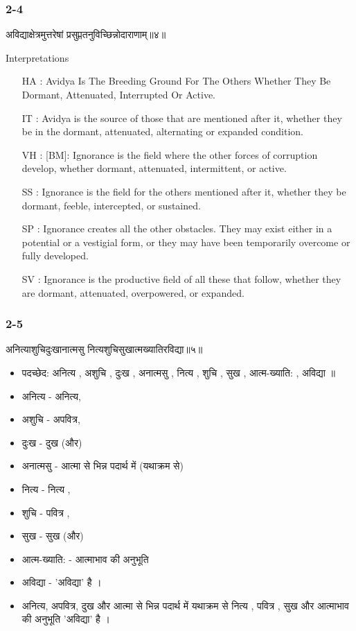 \begin{frame}[fragile]\frametitle{2-4}
\begin{sanskrit}
अविद्याक्षेत्रमुत्तरेषां प्रसुप्ततनुविच्छिन्नोदाराणाम्॥४॥
\end{sanskrit}

Interpretations
\begin{itemize}
\item [HA]: Avidya Is The Breeding Ground For The Others Whether They Be Dormant, Attenuated, Interrupted Or Active.
\item [IT]: Avidya is the source of those that are mentioned after it, whether they be in the dormant, attenuated, alternating or expanded condition.
\item [VH]: [BM]: Ignorance is the field where the other forces of corruption develop, whether dormant, attenuated, intermittent, or active.
\item [SS]: Ignorance is the field for the others mentioned after it, whether they be dormant, feeble, intercepted, or sustained.
\item [SP]: Ignorance creates all the other obstacles. They may exist either in a potential or a vestigial form, or they may have been temporarily overcome or fully developed.
\item [SV]: Ignorance is the productive field of all these that follow, whether they are dormant, attenuated, overpowered, or expanded. 
\end{itemize}
	
\end{frame}



\begin{frame}[fragile]\frametitle{2-5}
\begin{sanskrit}
अनित्याशुचिदुःखानात्मसु नित्यशुचिसुखात्मख्यातिरविद्या॥५॥
\end{sanskrit}

	\begin{itemize}
	\item पदच्छेद: अनित्य , अशुचि , दुःख , अनात्मसु , नित्य , शुचि , सुख , आत्म-ख्याति: , अविद्या ॥
	\item अनित्य - अनित्य,
	\item अशुचि - अपवित्र,
	\item दुःख - दुख (और)
	\item अनात्मसु - आत्मा से भिन्न पदार्थ में (यथाक्रम से)
	\item नित्य - नित्य ,
	\item शुचि - पवित्र ,
	\item सुख - सुख (और)
	\item आत्म-ख्याति: - आत्माभाव की अनुभूति
	\item अविद्या - 'अविद्या' है ।	
	\item अनित्य, अपवित्र, दुख और आत्मा से भिन्न पदार्थ में यथाक्रम से नित्य , पवित्र , सुख और आत्माभाव की अनुभूति 'अविद्या' है ।
	\end{itemize}
	
\end{frame}

